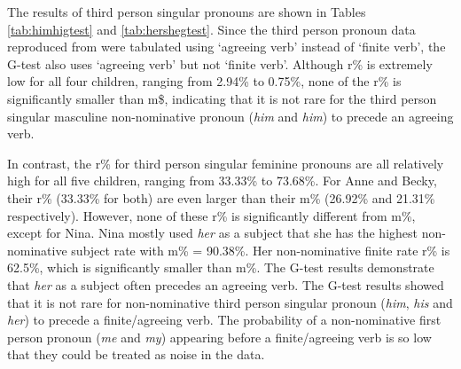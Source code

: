 The results of third person singular pronouns are shown in Tables \ref{tab:himhigtest} and \ref{tab:hershegtest}. Since the third person pronoun data reproduced from \cite{pine2005testing} were tabulated using `agreeing verb' instead of `finite verb', the G-test also uses `agreeing verb' but not `finite verb'.  Although r\% is extremely low for all four children, ranging from 2.94\% to 0.75\%, none of the r\% is significantly smaller than m\$, indicating that it is not rare for the third person singular masculine non-nominative pronoun (\textit{him} and \textit{him}) to precede an agreeing verb. 

In contrast, the r\% for third person singular feminine pronouns are all relatively high for all five children, ranging from 33.33\% to 73.68\%. For Anne and Becky, their r\% (33.33\% for both) are even larger than their m\% (26.92\% and 21.31\% respectively). However, none of these r\% is significantly different from m\%, except for Nina. Nina mostly used \textit{her} as a subject that she has the highest non-nominative subject rate with m\% = 90.38\%. Her non-nominative finite rate r\% is 62.5\%, which is significantly smaller than m\%. The G-test results demonstrate that \textit{her} as a subject often precedes an agreeing verb. 
The G-test results showed that it is not rare for non-nominative third person singular pronoun (\textit{him}, \textit{his} and \textit{her}) to precede a finite/agreeing verb. The probability of a non-nominative first person pronoun (\textit{me} and \textit{my}) appearing before a finite/agreeing verb is so low that they could be treated as noise in the data. 
\FloatBarrier
